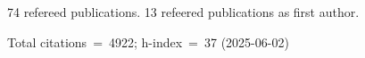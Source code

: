 74 refereed publications. 13 refeered publications as first author.

Total citations~=~4922; h-index~=~37 (2025-06-02)